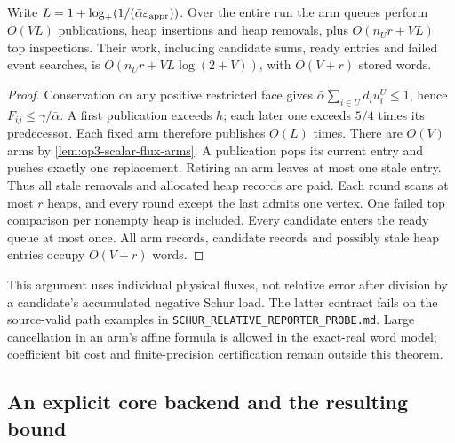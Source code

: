 \begin{lemma}
\label{lem:op3-scalar-flux-work}
Write $L=1+\log_+(1/(\bar\alpha\varepsilon_{\mathrm{appr}}))$. Over the entire run the arm
queues perform $O(VL)$ publications, heap insertions and heap removals,
plus $O(n_Ur+VL)$ top inspections. Their work, including candidate sums,
ready entries and failed event searches, is
$O(n_Ur+VL\log(2+V))$, with $O(V+r)$ stored words.
\end{lemma}
\begin{proof}
Conservation on any positive restricted face gives
$\bar\alpha\sum_{i\in U}d_i u_i^U\leq1$, hence
$F_{ij}\leq\gamma/\bar\alpha$. A first publication exceeds $h$;
each later one exceeds $5/4$ times its predecessor. Each fixed arm therefore
publishes $O(L)$ times. There are $O(V)$ arms by
\cref{lem:op3-scalar-flux-arms}. A publication pops its current entry and
pushes exactly one replacement. Retiring an arm leaves at most one stale
entry. Thus all stale removals and allocated heap records are paid.
Each round scans at most $r$ heaps, and every round except the last admits
one vertex. One failed top comparison per nonempty heap is included.
Every candidate enters the ready queue at most once. All arm records,
candidate records and possibly stale heap entries occupy $O(V+r)$ words.
\end{proof}

This argument uses individual physical fluxes, not relative error after
division by a candidate's accumulated negative Schur load. The latter
contract fails on the source-valid path examples in
\texttt{SCHUR\_RELATIVE\_REPORTER\_PROBE.md}. Large cancellation in an
arm's affine formula is allowed in the exact-real word model; coefficient
bit cost and finite-precision certification remain outside this theorem.

\subsection{An explicit core backend and the resulting bound}

